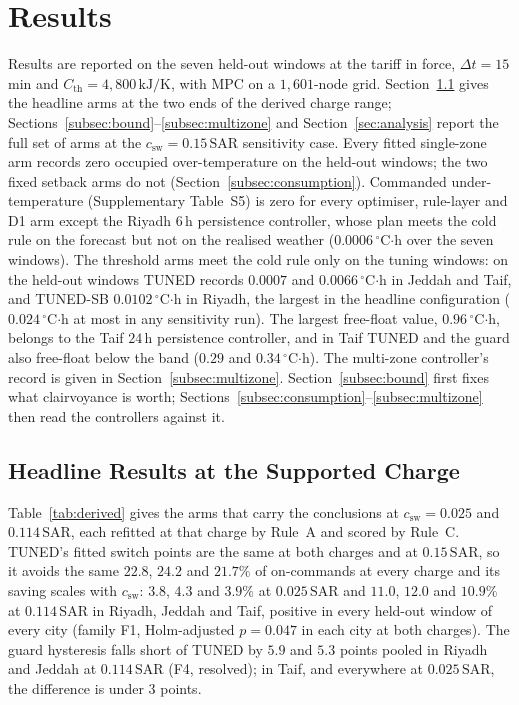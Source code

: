 \documentclass[3p,twocolumn,number]{elsarticle}
\newcommand{\Cth}{C_{\mathrm{th}}}
\newcommand{\csw}{c_{\mathrm{sw}}}
\newcommand{\SAR}{\text{SAR}}
\begin{document}
\section{Results}
\label{sec:results}

Results are reported on the seven held-out windows at the tariff in force, $\Delta t=15\,$min and $\Cth=4{,}800\,\text{kJ/K}$, with MPC on a $1{,}601$-node grid. Section~\ref{subsec:derived} gives the headline arms at the two ends of the derived charge range; Sections~\ref{subsec:bound}--\ref{subsec:multizone} and Section~\ref{sec:analysis} report the full set of arms at the $\csw=0.15\,\SAR$ sensitivity case. Every fitted single-zone arm records zero occupied over-temperature on the held-out windows; the two fixed setback arms do not (Section~\ref{subsec:consumption}). Commanded under-temperature (Supplementary Table~S5) is zero for every optimiser, rule-layer and D1 arm except the Riyadh $6\,$h persistence controller, whose plan meets the cold rule on the forecast but not on the realised weather ($0.0006\,^\circ$C$\cdot$h over the seven windows). The threshold arms meet the cold rule only on the tuning windows: on the held-out windows TUNED records $0.0007$ and $0.0066\,^\circ$C$\cdot$h in Jeddah and Taif, and TUNED-SB $0.0102\,^\circ$C$\cdot$h in Riyadh, the largest in the headline configuration ($0.024\,^\circ$C$\cdot$h at most in any sensitivity run). The largest free-float value, $0.96\,^\circ$C$\cdot$h, belongs to the Taif $24\,$h persistence controller, and in Taif TUNED and the guard also free-float below the band ($0.29$ and $0.34\,^\circ$C$\cdot$h). The multi-zone controller's record is given in Section~\ref{subsec:multizone}. Section~\ref{subsec:bound} first fixes what clairvoyance is worth; Sections~\ref{subsec:consumption}--\ref{subsec:multizone} then read the controllers against it.
 
\subsection{Headline Results at the Supported Charge}
\label{subsec:derived}

Table~\ref{tab:derived} gives the arms that carry the conclusions at $\csw=0.025$ and $0.114\,\SAR$, each refitted at that charge by Rule~A and scored by Rule~C. TUNED's fitted switch points are the same at both charges and at $0.15\,\SAR$, so it avoids the same $22.8$, $24.2$ and $21.7\%$ of on-commands at every charge and its saving scales with $\csw$: $3.8$, $4.3$ and $3.9\%$ at $0.025\,\SAR$ and $11.0$, $12.0$ and $10.9\%$ at $0.114\,\SAR$ in Riyadh, Jeddah and Taif, positive in every held-out window of every city (family F1, Holm-adjusted $p=0.047$ in each city at both charges). The guard hysteresis falls short of TUNED by $5.9$ and $5.3$ points pooled in Riyadh and Jeddah at $0.114\,\SAR$ (F4, resolved); in Taif, and everywhere at $0.025\,\SAR$, the difference is under $3$ points.
\end{document}
